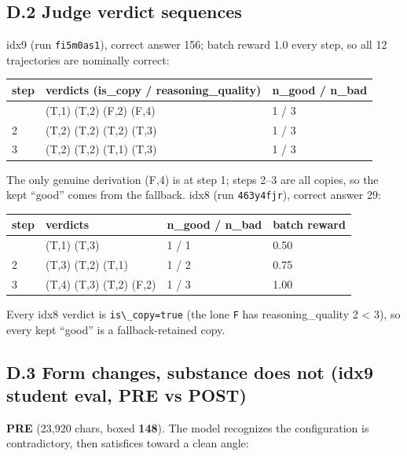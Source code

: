 \subsection{D.2 Judge verdict sequences}\label{d.2-judge-verdict-sequences}

idx9 (run \passthrough{\lstinline!fi5m0as1!}), correct answer 156; batch reward 1.0 every step, so all 12 trajectories are nominally correct:

\begin{longtable}[]{@{}lll@{}}
\toprule\noalign{}
step & verdicts (is\_copy / reasoning\_quality) & n\_good / n\_bad \\
\midrule\noalign{}
\endhead
\bottomrule\noalign{}
\endlastfoot
1 & (T,1) (T,2) (F,2) (F,4) & 1 / 3 \\
2 & (T,2) (T,2) (T,2) (T,3) & 1 / 3 \\
3 & (T,2) (T,2) (T,1) (T,3) & 1 / 3 \\
\end{longtable}

The only genuine derivation (F,4) is at step 1; steps 2--3 are all copies, so the kept ``good'' comes from the fallback. idx8 (run \passthrough{\lstinline!463y4fjr!}), correct answer 29:

\begin{longtable}[]{@{}llll@{}}
\toprule\noalign{}
step & verdicts & n\_good / n\_bad & batch reward \\
\midrule\noalign{}
\endhead
\bottomrule\noalign{}
\endlastfoot
1 & (T,1) (T,3) & 1 / 1 & 0.50 \\
2 & (T,3) (T,2) (T,1) & 1 / 2 & 0.75 \\
3 & (T,4) (T,3) (T,2) (F,2) & 1 / 3 & 1.00 \\
\end{longtable}

Every idx8 verdict is \passthrough{\lstinline!is\_copy=true!} (the lone \passthrough{\lstinline!F!} has reasoning\_quality 2 \textless{} 3), so every kept ``good'' is a fallback-retained copy.

\subsection{D.3 Form changes, substance does not (idx9 student eval, PRE vs POST)}\label{d.3-form-changes-substance-does-not-idx9-student-eval-pre-vs-post}

\textbf{PRE} (23,920 chars, boxed \textbf{148}). The model recognizes the configuration is contradictory, then satisfices toward a clean angle:

